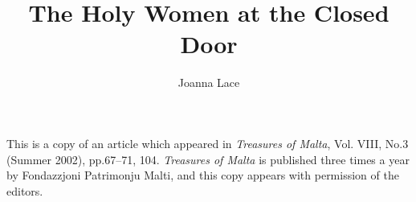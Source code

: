 \documentclass[a4paper,12pt]{article}
\begin{document}
\title{The Holy Women at the Closed Door}
\author{Joanna Lace}
\date{}
\maketitle


{\narrower
This is a copy of an article which appeared in
{\it Treasures of Malta},
Vol. VIII, No.3 (Summer 2002), pp.67--71, 104. 
{\it Treasures of Malta} is published three times a year by
Fondazzjoni Patrimonju Malti, and this copy appears with permission of
the editors.
}
\end{document}
